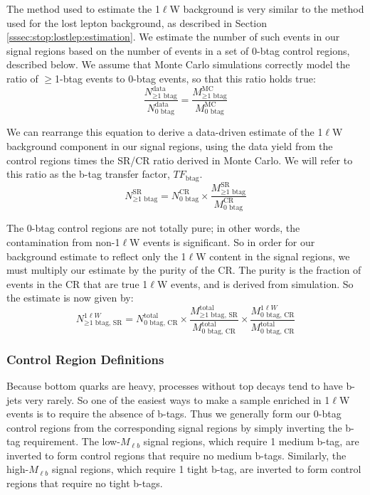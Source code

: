 The method used to estimate the 1$\ell$W background is very similar to
the method used for the lost lepton background, as described in
Section \ref{sssec:stop:lostlep:estimation}. We estimate the number of
such events in our signal regions based on the number of events in a
set of 0-btag control regions, described below. We assume that Monte
Carlo simulations correctly model the ratio of $\geq$1-btag events to
0-btag events, so that this ratio holds true:
\begin{equation}
\label{eq:stop:1lw:rationm}
\frac{N_{\geq\text{1 btag}}^\text{data}}{N_\text{0 btag}^\text{data}} = \frac{M_{\geq\text{1 btag}}^\text{MC}}{M_\text{0 btag}^\text{MC}}
\end{equation}

We can rearrange this equation to derive
a data-driven estimate of the 1$\ell$W background component in our
signal regions, using the data yield from the control regions times
the SR/CR ratio derived in Monte Carlo. We will refer to this ratio as
the b-tag transfer factor, $TF_\text{btag}$.
\begin{equation}
\label{eq:stop:1lw:estimateimpure}
N_{\geq\text{1 btag}}^\text{SR} = N_\text{0 btag}^\text{CR} \times
\frac{M_{\geq\text{1 btag}}^\text{SR}}{M_\text{0 btag}^\text{CR}}
\end{equation}

The 0-btag control regions are not totally pure; in other words, the
contamination from non-1$\ell$W events is significant. So in order for
our background estimate to reflect only the 1$\ell$W content in the
signal regions, we must multiply our estimate by the purity of the
CR. The purity is the fraction of events in the CR that are true
1$\ell$W events, and is derived from simulation. So the estimate is
now given by:
\begin{equation}
\label{eq:stop:1lw:estimatepure}
N_{\geq\text{1 btag, SR}}^{1\ell W} = N_\text{0 btag, CR}^\text{total} \times
\frac{M_{\geq\text{1 btag, SR}}^\text{total}}{M_\text{0 btag, CR}^\text{total}} \times
\frac{M_\text{0 btag, CR}^{1\ell W}}{M_\text{0 btag, CR}^\text{total}}
\end{equation}

\subsubsection{Control Region Definitions}
\label{sssec:stop:1lw:crdefinitions}

Because bottom quarks are heavy, processes without top decays tend to
have b-jets very rarely. So one of the easiest ways to make a sample
enriched in 1$\ell$W events is to require the absence of b-tags.
Thus we generally form our 0-btag control regions from the
corresponding signal regions by simply inverting
the b-tag requirement. The low-$M_{\ell b}$ signal regions, which
require 1 medium b-tag, are inverted to form control regions that require no medium
b-tags. Similarly, the high-$M_{\ell b}$ signal regions, which require
1 tight b-tag, are inverted to form control regions that require no
tight b-tags.

